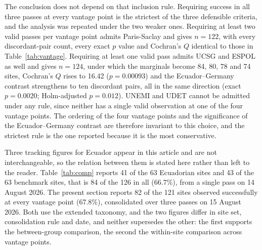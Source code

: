 \documentclass[pdflatex,sn-basic,Numbered,iicol]{sn-jnl}
\theoremstyle{thmstyleone}
\theoremstyle{thmstyletwo}
\theoremstyle{thmstylethree}
\begin{document}
The conclusion does not depend on that inclusion rule. Requiring success in all three passes at every vantage point is the strictest of the three defensible criteria, and the analysis was repeated under the two weaker ones. Requiring at least two valid passes per vantage point admits Paris-Saclay and gives $n=122$, with every discordant-pair count, every exact $p$ value and Cochran's $Q$ identical to those in Table~\ref{tab:vantage}. Requiring at least one valid pass admits UCSG and ESPOL as well and gives $n=124$, under which the marginals become 84, 80, 78 and 74 sites, Cochran's $Q$ rises to 16.42 ($p=0.00093$) and the Ecuador--Germany contrast strengthens to ten discordant pairs, all in the same direction (exact $p=0.0020$; Holm-adjusted $p=0.012$). UNEMI and UDET cannot be admitted under any rule, since neither has a single valid observation at one of the four vantage points. The ordering of the four vantage points and the significance of the Ecuador--Germany contrast are therefore invariant to this choice, and the strictest rule is the one reported because it is the most conservative.

Three tracking figures for Ecuador appear in this article and are not interchangeable, so the relation between them is stated here rather than left to the reader. Table~\ref{tab:comp} reports 41 of the 63 Ecuadorian sites and 43 of the 63 benchmark sites, that is 84 of the 126 in all (66.7\%), from a single pass on 14 August 2026. The present section reports 82 of the 121 sites observed successfully at every vantage point (67.8\%), consolidated over three passes on 15 August 2026. Both use the extended taxonomy, and the two figures differ in site set, consolidation rule and date, and neither supersedes the other: the first supports the between-group comparison, the second the within-site comparison across vantage points.
\end{document}
